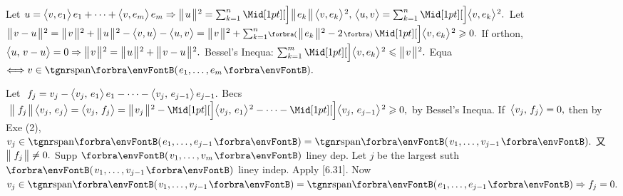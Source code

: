 \SepLine

Let $u=\Ang{v,e_1}\,e_1+\dots+\Ang{v,e_m}\,e_m\Rightarrow\Dvertsq{u}=\sum_{k=1}^n\innerAsq[{\:\!\Dvert{e_k}\,}]{v,e_k},\,\Ang{u,v}=\sum_{k=1}^n\innerAsq{v,e_k}.$\vspace{3pt}\parSol{}
Let $\Dvertsq{v-u}=\Dvertsq{v}+\Dvertsq{u}-\Ang{v,u}-\Ang{u,v}=\Dvertsq{v}+\sum_{k=1}^n\!\BigPar{\Dvertsq{e_k}-2}\,\innerAsq{v,e_k}\geqslant0.$\PfEnd\vspace{4pt}
\ACoro If orthon, $\big\langle{}u,\,v-u{}\big\rangle=0\Rightarrow\big\Vert\hspace{1pt}{}v{}\hspace{1pt}\big\Vert{\hspace{0.5pt}}{^2}=\big\Vert\hspace{1pt}{}u{}\hspace{1pt}\big\Vert{\hspace{0.5pt}}{^2}+\big\Vert\hspace{1pt}{}v-u{}\hspace{1pt}\big\Vert{\hspace{0.5pt}}{^2}.$\vspace{1pt}\parCor
Bessel's Inequa: $\sum_{k=1}^m\innerAsq{v,e_k}\leqslant\Dvertsq{v}.$ \: Equa $\Longleftrightarrow v\in\Span{e_1,\dots,e_m}.$
\SepLine\pagebreak

Let $\;f_j=v_j-\big\langle{}v_j,\,e_1{}\big\rangle\,e_1-\dots-\big\langle{}v_j,\,e_{j-1}{}\big\rangle\,e_{j-1}.$\vspace{2pt}\parSol{}
Becs $\;\Dvert{\,f_j}\,\Ang{v_j,\,e_j}=\Ang{v_j,\,f_j}=\Dvertsq{v_j}-\innerAsq{v_j,\,e_1}-\dots-\innerAsq{v_j,\,e_{j-1}}\geqslant0,$ by Bessel's Inequa.\vspace{2pt}\parSol{}
If $\,\big\langle{}v_j,\,f_j{}\big\rangle=0,$ then by Exe (2), $v_j\in\Span{e_1,\dots,e_{j-1}}=\Span{v_1,\dots,v_{j-1}}.$ 又 $\big\Vert\hspace{1pt}{}\,f_j{}\hspace{1pt}\big\Vert\neq0.$\PfEnd\vspace{3pt}
\ANote Supp $\Par{v_1,\dots,v_m}$ liney dep. Let $j$ be the largest suth $\Par{v_1,\dots,v_{j-1}}$ liney indep.\parNot
Apply [6.31]. Now $v_j\in\Span{v_1,\dots,v_{j-1}}=\Span{e_1,\dots,e_{j-1}}\Rightarrow f_j=0.$
\SepLine

